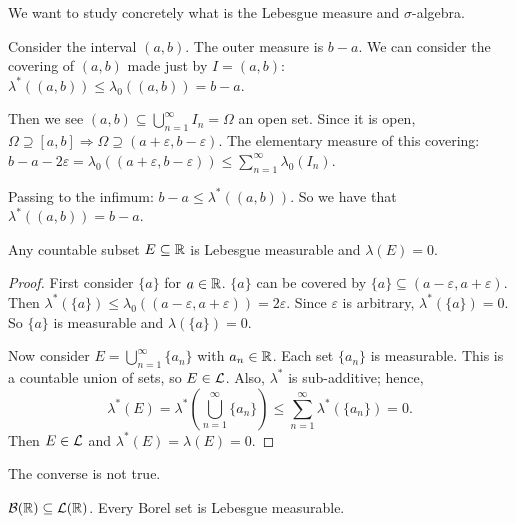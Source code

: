We want to study concretely what is the Lebesgue measure and $\sigma$-algebra.

\begin{remark}
Consider the interval $(a,b)$. The outer measure is $b-a$. We can consider the covering of $(a,b)$ made just by $I = (a,b)$:
$\lambda^*((a,b)) \leq \lambda_0((a,b)) = b - a$.

Then we see $(a,b) \subseteq \bigcup_{n=1}^{\infty} I_n = \Omega$ an open set. Since it is open, $\Omega \supseteq [a,b] \Rightarrow \Omega \supseteq (a+\varepsilon, b-\varepsilon)$. The elementary measure of this covering:
$b - a - 2\varepsilon = \lambda_0((a+\varepsilon, b-\varepsilon)) \leq \sum_{n=1}^{\infty} \lambda_0(I_n)$.

Passing to the infimum: $b - a \leq \lambda^*((a,b))$. So we have that $\lambda^*((a,b)) = b - a$.
\end{remark}

\begin{theorem}
Any countable subset $E \subseteq \mathbb{R}$ is Lebesgue measurable and $\lambda(E) = 0$.
\end{theorem}

\begin{proof}
First consider $\{a\}$ for $a \in \mathbb{R}$. $\{a\}$ can be covered by $\{a\} \subseteq (a-\varepsilon, a+\varepsilon)$. Then $\lambda^*(\{a\}) \leq \lambda_0((a-\varepsilon, a+\varepsilon)) = 2\varepsilon$. Since $\varepsilon$ is arbitrary, $\lambda^*(\{a\}) = 0$. So $\{a\}$ is measurable and $\lambda(\{a\}) = 0$.

Now consider $E = \bigcup_{n=1}^{\infty} \{a_n\}$ with $a_n \in \mathbb{R}$. Each set $\{a_n\}$ is measurable. This is a countable union of sets, so $E \in \mathcal{L}$. Also, $\lambda^*$ is sub-additive; hence,
\[
\lambda^*(E) = \lambda^*\left(\bigcup_{n=1}^{\infty} \{a_n\}\right) \leq \sum_{n=1}^{\infty} \lambda^*(\{a_n\}) = 0.
\]
Then $E \in \mathcal{L}$ and $\lambda^*(E) = \lambda(E) = 0$.
\end{proof}

\begin{remark}
The converse is not true.
\end{remark}

\clearpage
\begin{theorem}
$\mathcal{B}(\mathbb{R}) \subseteq \mathcal{L}(\mathbb{R})$. Every Borel set is Lebesgue measurable.
\end{theorem}

